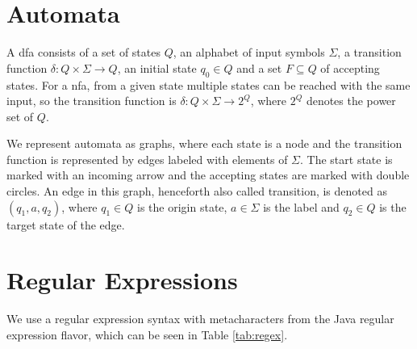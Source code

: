 \section{Automata}\label{sec:background:automata}

A \acf{dfa} consists of a set of states $Q$, an alphabet of input symbols $\Sigma$, a transition function $\delta: Q \times \Sigma \rightarrow Q$, an initial state $q_0 \in Q$ and a set $F \subseteq Q$ of accepting states.
For a \acf{nfa}, from a given state multiple states can be reached with the same input, so the transition function is  $\delta: Q \times \Sigma \rightarrow 2^Q$, where $2^Q$ denotes the power set of $Q$.

We represent automata as graphs, where each state is a node and the transition function is represented by edges labeled with elements of $\Sigma$. The start state is marked with an incoming arrow and the accepting states are marked with double circles.
An edge in this graph, henceforth also called transition, is denoted as $(q_1, a, q_2)$, where $q_1 \in Q$ is the origin state, $a \in \Sigma$ is the label and $q_2 \in Q$ is the target state of the edge.

\section{Regular Expressions}\label{sec:background:regex}

We use a regular expression syntax with metacharacters from the Java regular expression flavor, which can be seen in Table \ref{tab:regex}.

